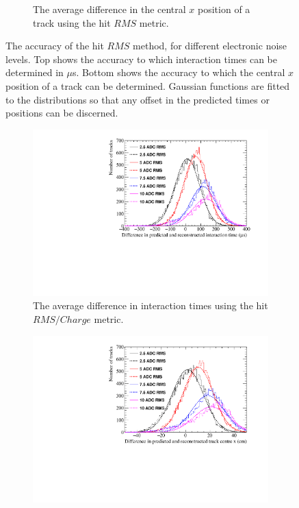 \begin{figure}
\begin{subfigure}{0.6\textwidth}
    \caption{The average difference in the central $x$ position of a track using the hit $RMS$ metric.}
    \label{fig:DiffNoiseStudy_AvDiffRMS_X}
  \end{subfigure}
  \caption[Comparing the accuracy of the hit $RMS$ method, as the electronic noise changes]
          {The accuracy of the hit $RMS$ method, for different electronic noise levels. Top shows the accuracy to which interaction times can be determined in $\mu$s. Bottom shows the accuracy to which the central $x$ position of a track can be determined. Gaussian functions are fitted to the distributions so that any offset in the predicted times or positions can be discerned.}
  \label{fig:DiffNoiseStudy_AvDiff_RMS}
\end{figure}

\begin{figure}
  \centering
  \begin{subfigure}{0.6\textwidth}
    \centering
    \includegraphics[width=\textwidth]{Canvas_AvDiff_T_RMS_Q_NoiseLevel}
    \caption{The average difference in interaction times using the hit $RMS/Charge$ metric.}
    \label{fig:DiffNoiseStudy_AvDiff_RMS_Int_T}
  \end{subfigure}
  \begin{subfigure}{0.6\textwidth}
    \centering
    \includegraphics[width=\textwidth]{Canvas_AvDiff_X_RMS_Q_NoiseLevel}

\end{subfigure}
\end{figure}
